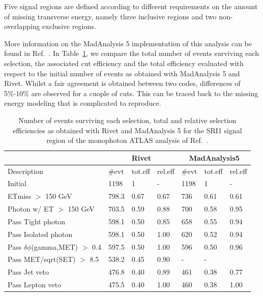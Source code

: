 \documentclass[11pt]{cernrep}
\begin{document}
Five signal regions are defined according to different requirements on the
amount of missing transverse energy, namely three inclusive regions and two
non-overlapping exclusive regions.

More information on the MadAnalysis 5 implementation of this analysis can be
found in Ref.~\cite{inspire_monophoton}. In Table~\ref{tab:1704.03848}, we
compare the total number of events surviving each selection, the associated cut
efficiency and the total efficiency evaluated with respect to the initial number
of events as obtained with MadAnalysis 5 and Rivet. Whilst a fair agreement is
obtained between two codes, differences of 5\%-10\% are observed for a cuople of
cuts. This can be traced back to the missing energy modeling that is complicated
to reproduce.

\begin{table}
 \centering
  \begin{tabular}{ | l || l | l | l || l | l | l | }
\hline
                  &  \multicolumn{3}{c||}{\bf Rivet} & \multicolumn{3}{c||}{\bf MadAnalysis5}    \\ \hline

Description       & \#evt & tot.eff & rel.eff & \#evt & tot.eff & rel.eff    \\ \hline \hline

Initial                    &  	1198	& 1		  & -     & 1198	& 1	 &    -      \\ \hline
ETmiss $>$ 150 GeV           &   	798.3	& 0.67	& 0.67	& 736	& 0.61 &  0.61     \\ \hline
Photon w/ ET $>$ 150 GeV     &   	703.5	& 0.59	& 0.88	& 700	& 0.58 &  0.95     \\ \hline
Pass Tight photon          &   	598.1	& 0.50	& 0.85	& 658	& 0.55 & 	0.94     \\ \hline
Pass Isolated photon       &   	598.1	& 0.50	& 1.00	& 620	& 0.52 & 	0.94     \\ \hline
Pass $\delta\phi$(gamma,MET) $>$ 0.4 &   	597.5	& 0.50	& 1.00	& 596	& 0.50 & 	0.96     \\ \hline
Pass MET/sqrt(SET) $>$ 8.5   &   	538.2	& 0.45	& 0.90	& -	  &  -   &     	     \\ \hline
Pass Jet veto              &   	476.8	& 0.40	& 0.89	& 461	& 0.38 & 	0.77     \\ \hline
Pass Lepton veto           &   	475.5	& 0.40	& 1.00	& 460	& 0.38 & 	1.00     \\ \hline
  \end{tabular}
 \caption{Number of events surviving each selection, total and relative
  selection efficiencies as obtained with Rivet and MadAnalysis 5 for the SRI1
  signal region of the monophoton ATLAS analysis of Ref.~\cite{Aaboud:2017dor}.}
 \label{tab:1704.03848}
\end{table}
\end{document}
